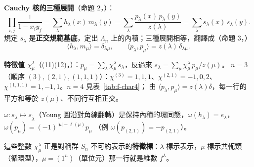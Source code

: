 \textbf{Cauchy 核的三種展開}（命題 2，）：
\[
\prod_{i,j}\frac{1}{1-x_iy_j}=\sum_\lambda h_\lambda(x)\,m_\lambda(y)=\sum_\lambda\frac{p_\lambda(x)\,p_\lambda(y)}{z(\lambda)}=\sum_\lambda s_\lambda(x)\,s_\lambda(y) .
\]
規定 $s_\lambda$ 是\textbf{正交規範基底}，定出 $\Lambda_n$ 上的內積；三種展開相等，翻譯成（命題 3，）
\[
\langle h_\lambda,m_\mu\rangle=\delta_{\lambda\mu},\qquad \langle p_\lambda,p_\mu\rangle=z(\lambda)\,\delta_{\lambda\mu} .
\]

\textbf{特徵值 $\chi^\lambda_\mu$}（(11)(12)，）：$p_\mu=\sum_\lambda\chi^\lambda_\mu\,s_\lambda$，反過來 $s_\lambda=\sum_\mu\chi^\lambda_\mu\,p_\mu/z(\mu)$。
$n=3$（順序 $(3),(2,1),(1,1,1)$）：$\chi^{(3)}=1,1,1$、$\chi^{(2,1)}=-1,0,2$、$\chi^{(1,1,1)}=1,-1,1$。$n=4$ 見表~\ref{tab:f-char4}；
由 $\langle p_\lambda,p_\mu\rangle=z(\lambda)\delta$，每一行的平方和等於 $z(\mu)$、不同行互相正交。

\begin{table}[H]
\centering
\FulCharFour
\caption{$n=4$ 的 $\chi^\lambda_\mu$（$p_\mu=\sum_\lambda\chi^\lambda_\mu s_\lambda$），最後一列是 $z(\mu)$。$\mu=(1,1,1,1)$ 那一行是 $f^\lambda=1,3,2,3,1$。}
\label{tab:f-char4}
\end{table}

\begin{keybox}
$\omega:s_\lambda\mapsto s_{\tilde\lambda}$（Young 圖沿對角線翻轉）是保持內積的環同態，$\omega(h_\lambda)=e_\lambda$，$\omega(p_\mu)=(-1)^{|\mu|-\ell(\mu)}p_\mu$
（例 $\omega(p_{(2,1)})=-p_{(2,1)}$）。
\end{keybox}

\begin{notebox}[預告第 7 章]
這些整數 $\chi^\lambda_\mu$ 正是對稱群 $S_n$ 不可約表示的\textbf{特徵標}：$\lambda$ 標示表示，$\mu$ 標示共軛類（循環型），$\mu=(1^n)$（單位元）那一行就是維數 $f^\lambda$。
\end{notebox}
